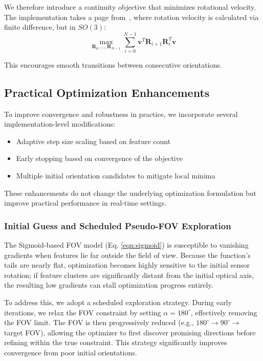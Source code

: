 \documentclass[letterpaper, 10 pt, conference]{ieeeconf}  %
\begin{document}
We therefore introduce a continuity objective that minimizes rotational velocity. The implementation takes a page from~\cite{ratliff2009chomp}, where rotation velocity is calculated via finite difference, but in $SO(3)$:
\begin{equation}
\max_{\boldsymbol{R}_0, \dots, \boldsymbol{R}_{N-1}}
\sum_{i=0}^{N-1} \boldsymbol{v}^T \boldsymbol{R}_{i+1} \boldsymbol{R}_i^T \boldsymbol{v}
\end{equation}

This encourages smooth transitions between consecutive orientations.

\subsection{Practical Optimization Enhancements}

To improve convergence and robustness in practice, we incorporate several implementation-level modifications:
\begin{itemize}
    \item Adaptive step size scaling based on feature count
    \item Early stopping based on convergence of the objective
    \item Multiple initial orientation candidates to mitigate local minima
\end{itemize}
These enhancements do not change the underlying optimization formulation but improve practical performance in real-time settings.

\subsubsection{Initial Guess and Scheduled Pseudo-FOV Exploration}

The Sigmoid-based FOV model (Eq. \ref{eqn:sigmoid}) is susceptible to vanishing gradients when features lie far outside the field of view. Because the function's tails are nearly flat, optimization becomes highly sensitive to the initial sensor rotation; if feature clusters are significantly distant from the initial optical axis, the resulting low gradients can stall optimization progress entirely.

To address this, we adopt a scheduled exploration strategy. During early iterations, we relax the FOV constraint by setting $\alpha = 180^\circ$, effectively removing the FOV limit. The FOV is then progressively reduced (e.g., $180^\circ \rightarrow 90^\circ \rightarrow$ target FOV), allowing the optimizer to first discover promising directions before refining within the true constraint.
This strategy significantly improves convergence from poor initial orientations.
\end{document}
